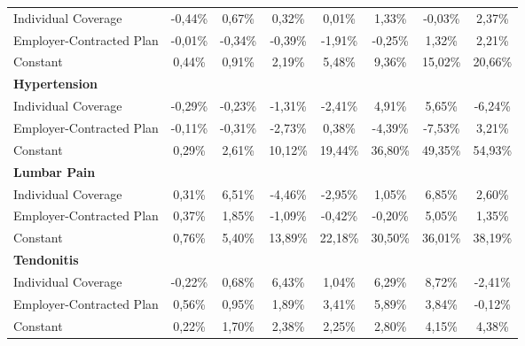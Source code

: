 \documentclass{article}
\begin{document}
\begin{table*}
{\begin{tabular}{l*{7}{c}}
Individual Coverage & -0,44\%\sym{***}& 0,67\% & 0,32\% & 0,01\% & 1,33\% & -0,03\% & 2,37\% \\
Employer-Contracted Plan& -0,01\% & -0,34\% & -0,39\% & -1,91\%\sym{*}  & -0,25\% & 1,32\% & 2,21\% \\
Constant            & 0,44\%\sym{***}& 0,91\%\sym{***}& 2,19\%\sym{***}& 5,48\%\sym{***}& 9,36\%\sym{***}& 15,02\%\sym{***}& 20,66\%\sym{***}\\

\midrule
\textbf{Hypertension} & & & & & & & \\

Individual Coverage & -0,29\%\sym{**} & -0,23\% & -1,31\% & -2,41\% & 4,91\% & 5,65\% & -6,24\% \\
Employer-Contracted Plan& -0,11\% & -0,31\% & -2,73\%\sym{*}  & 0,38\% & -4,39\% & -7,53\%\sym{*}  & 3,21\% \\
Constant            & 0,29\%\sym{**} & 2,61\%\sym{***}& 10,12\%\sym{***}& 19,44\%\sym{***}& 36,80\%\sym{***}& 49,35\%\sym{***}& 54,93\%\sym{***}\\

\midrule
\textbf{Lumbar Pain} & & & & & & & \\

Individual Coverage & 0,31\% & \cellcolor[gray]{0.9} 6,51\%\sym{*}  & -4,46\% & -2,95\% & 1,05\% & 6,85\% & 2,60\% \\
Employer-Contracted Plan& 0,37\% & 1,85\% & -1,09\% & -0,42\% & -0,20\% & 5,05\% & 1,35\% \\
Constant            & 0,76\%\sym{***}& 5,40\%\sym{***}& 13,89\%\sym{***}& 22,18\%\sym{***}& 30,50\%\sym{***}& 36,01\%\sym{***}& 38,19\%\sym{***}\\

\midrule
\textbf{Tendonitis} & & & & & & & \\

Individual Coverage & -0,22\%\sym{*}  & 0,68\% & \cellcolor[gray]{0.9} 6,43\%\sym{**} & 1,04\% & \cellcolor[gray]{0.9} 6,29\%\sym{**} & \cellcolor[gray]{0.9} 8,72\%\sym{**} & -2,41\% \\
Employer-Contracted Plan&  \cellcolor[gray]{0.9} 0,56\%\sym{*}  & 0,95\% & \cellcolor[gray]{0.9} 1,89\% & \cellcolor[gray]{0.9} 3,41\%\sym{**} & \cellcolor[gray]{0.9} 5,89\%\sym{***}& \cellcolor[gray]{0.9}  3,84\%\sym{*}  & -0,12\% \\
Constant            & 0,22\%\sym{*}  & 1,70\%\sym{***}& 2,38\%\sym{***}& 2,25\%\sym{***}& 2,80\%\sym{***}& 4,15\%\sym{***}& 4,38\%\sym{***}\\



\end{tabular}}
\end{table*}
\end{document}
